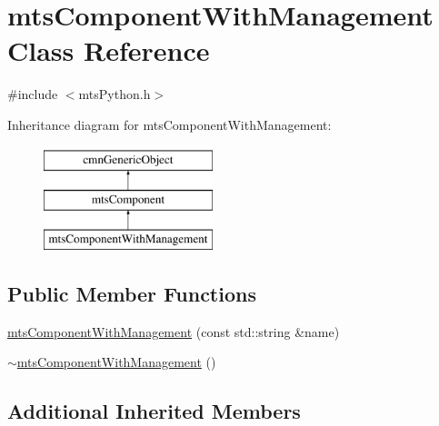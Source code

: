 \hypertarget{classmts_component_with_management}{\section{mts\-Component\-With\-Management Class Reference}
\label{classmts_component_with_management}
}


{\ttfamily \#include $<$mts\-Python.\-h$>$}

Inheritance diagram for mts\-Component\-With\-Management\-:\begin{figure}[H]
\begin{center}
\leavevmode
\includegraphics[height=3.000000cm]{db/d6e/classmts_component_with_management}
\end{center}
\end{figure}
\subsection*{Public Member Functions}
\begin{DoxyCompactItemize}
\item 
\hyperlink{classmts_component_with_management_a42fe6cff7ac91bafbbf51390093dc1ef}{mts\-Component\-With\-Management} (const std\-::string \&name)
\item 
\hyperlink{classmts_component_with_management_a4a9a3a8ed5c4c098cac90c5403c86672}{$\sim$mts\-Component\-With\-Management} ()
\end{DoxyCompactItemize}
\subsection*{Additional Inherited Members}


